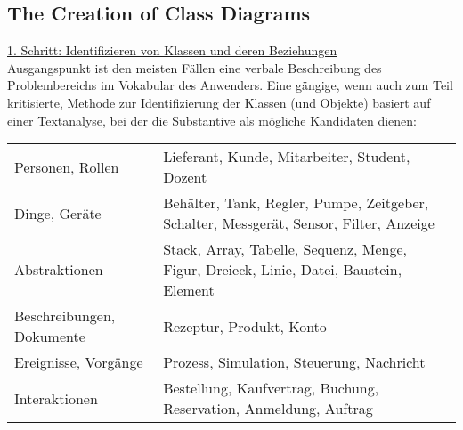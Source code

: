 \begin{minipage}[c]{0.45\linewidth}
\subsection{The Creation of Class Diagrams}
\underline{1. Schritt: Identifizieren von Klassen und deren Beziehungen}\\[2ex]
Ausgangspunkt ist den meisten F\"allen eine verbale Beschreibung des
Problembereichs im Vokabular des Anwenders. Eine g\"angige, wenn
auch zum Teil kritisierte, Methode
zur Identifizierung der Klassen (und Objekte) basiert auf einer Textanalyse,
bei der die Substantive als m\"ogliche Kandidaten dienen:\\[2ex]
\begin{tabularx}{\linewidth}{l|X}
Personen, Rollen & Lieferant, Kunde, Mitarbeiter, Student, Dozent \\
Dinge, Ger\"ate  & Beh\"alter, Tank, Regler, Pumpe, Zeitgeber, Schalter,
            Messger\"at, Sensor, Filter, Anzeige\\
Abstraktionen & Stack, Array, Tabelle, Sequenz, Menge, Figur, Dreieck, Linie,
    Datei, Baustein, Element\\
Beschreibungen, Dokumente & Rezeptur, Produkt, Konto\\
Ereignisse, Vorg\"ange & Prozess, Simulation, Steuerung, Nachricht\\
Interaktionen& Bestellung, Kaufvertrag, Buchung, Reservation,
Anmeldung, Auftrag
\end{tabularx}


\end{minipage}
